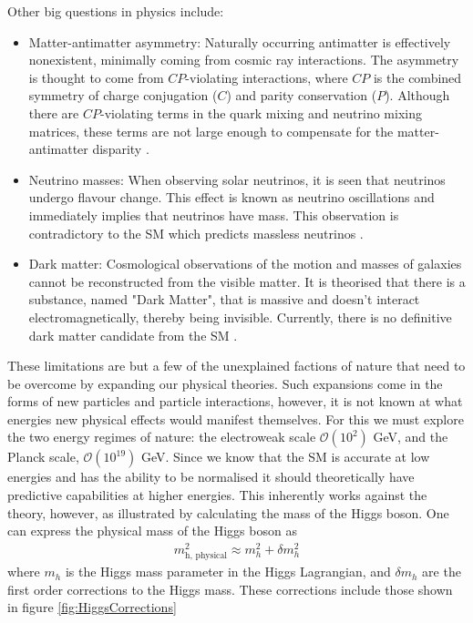 \documentclass[12pt, oneside]{article}   	%
\begin{document}
Other big questions in physics include:
\begin{itemize}
\item Matter-antimatter asymmetry: Naturally occurring antimatter is effectively nonexistent, minimally coming from cosmic ray interactions. 
The asymmetry is thought to come from $CP$-violating interactions, where $CP$ is the combined symmetry of charge conjugation ($C$) and parity conservation ($P$).  
Although there are $CP$-violating terms in the quark mixing and neutrino mixing matrices, these terms are not large enough to compensate for the matter-antimatter disparity \cite{canetti2012matter}.

\item Neutrino masses: When observing solar neutrinos, it is seen that neutrinos undergo flavour change. 
This effect is known as neutrino oscillations and immediately implies that neutrinos have mass.
This observation is contradictory to the SM which predicts massless neutrinos \cite{olive2014review}.

\item Dark matter: Cosmological observations of the motion and masses of galaxies cannot be reconstructed from the visible matter.
It is theorised that there is a substance, named "Dark Matter", that is massive and doesn't interact electromagnetically, thereby being invisible.
Currently, there is no definitive dark matter candidate from the SM \cite{bertone2005particle}. 
\end{itemize}
These limitations are but a few of the unexplained factions of nature that need to be overcome by expanding our physical theories.
Such expansions come in the forms of new particles and particle interactions, however, it is not known at what energies new physical effects would manifest themselves.
For this we must explore the two energy regimes of nature: the electroweak scale $\mathcal{O}(10^{2})$ GeV, and the Planck scale, $\mathcal{O}(10^{19})$ GeV.
Since we know that the SM is accurate at low energies and has the ability to be normalised it should theoretically have predictive capabilities at higher energies.
This inherently works against the theory, however, as illustrated by calculating the mass of the Higgs boson.
One can express the physical mass of the Higgs boson as 
\begin{align}
m_{\textrm{h, physical}}^{2} \approx m_{h}^{2} + \delta m_{h}^{2}
\end{align}
where $m_{h}$ is the Higgs mass parameter in the Higgs Lagrangian, and $\delta m_{h}$ are the first order corrections to the Higgs mass.
These corrections include those shown in figure \ref{fig:HiggsCorrections}
\end{document}
